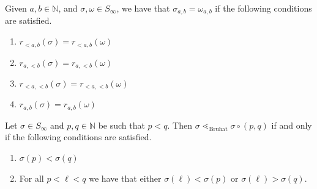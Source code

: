 \documentclass[10pt,a4paper]{amsart}
\newcommand{\nn}{\ensuremath{\mathbb{N}}}
\begin{document}
\begin{lemma}\label{lem: criteria for equal permutation matrices}
    Given $a , b \in \nn$, and $\sigma , \omega \in S_\infty$, we have that $\sigma_{a , b} = \omega_{a , b}$ if the following conditions are satisfied.  
    \begin{enumerate}
        \item $r_{<a , b}(\sigma) = r_{<a , b}(\omega)$
        \item $r_{a , <b}(\sigma) = r_{a , <b}(\omega)$
        \item $r_{<a , <b}(\sigma) = r_{<a , <b}(\omega)$
        \item $r_{a , b}(\sigma) = r_{a , b}(\omega)$
    \end{enumerate} 
\end{lemma}

\begin{proposition}\label{prop: cover relations in the bruhat order}
    Let $\sigma \in S_\infty$ and $p, q \in \nn$ be such that $p < q$. Then $\sigma \lessdot_\text{Bruhat} \sigma \circ (p , q)$ if and only if the following conditions are satisfied. 
    \begin{enumerate}
        \item[(C1)] $\sigma(p) < \sigma(q)$
        \item[(C2)] For all $p < \ell < q$ we have that either $\sigma(\ell) < \sigma(p)$ or $\sigma(\ell) > \sigma(q)$.
    \end{enumerate}
\end{proposition}
\end{document}
